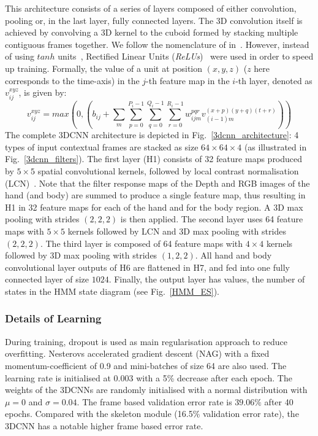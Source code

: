 This  architecture consists of a series of layers composed of either convolution, pooling or, in the last layer, fully connected layers.
The 3D convolution itself is achieved by convolving a 3D kernel to the cuboid formed by stacking multiple contiguous frames together.
We follow the nomenclature of in~\cite{ji20133d}.
However, instead of using $tanh$ units~\cite{ji20133d},  Rectified Linear Units (\emph{ReLUs})~\cite{krizhevsky2012imagenet}
were used in order to speed up training.
Formally, the value of a unit at position $(x, y, z)$ ($z$ here corresponds to the time-axis) in the $j$-th feature map in the $i$-th layer, denoted as $v^{xyz}_{ij}$, is given by:
\begin{equation}
v^{xyz}_{ij} =  max( 0,  ( b_{ij} + \sum_m \sum_{p=0}^{P_i - 1} \sum_{q=0}^{Q_i -1 } \sum_{r=0}^{R_i -1} w^{pqr}_{ijm} v^{(x+p)(y+q)(t+r)}_{(i-1)m} ))
\label{ReLU}
\end{equation}
%
The complete 3DCNN architecture is depicted in Fig.~\ref{3dcnn_architecture}:
4 types of input contextual frames are stacked as size $64\times64\times4$ (as illustrated in Fig.~\ref{3dcnn_filters}).
%
The first layer (H1) consists of 32 feature maps produced by $5\times5$ spatial convolutional kernels,
followed by local contrast normalisation (LCN)~\cite{jarrett2009best}.
%
Note that the filter response maps of the Depth and RGB images of the hand (and body) are summed to produce a single feature map,
thus resulting in H1 in 32 feature maps for each of the hand and for the body region.
%
A 3D max pooling with strides $(2,2,2)$ is then applied.
%
The second layer uses 64 feature maps with $5\times5$ kernels followed by LCN and 3D max pooling with strides $(2,2,2)$.
The third layer is composed of 64 feature maps with $4\times4$ kernels followed by 3D max pooling with strides $(1,2,2)$.
All hand and body convolutional layer outputs of H6 are flattened in H7, and fed into one fully connected layer of size $1024$.
%
Finally, the output layer has \numberhiddenstate values, the number of states in the HMM state diagram (see Fig.~\ref{HMM_ES}).




\subsubsection{Details of Learning}
During training, dropout \cite{hinton2012improving} is used as main regularisation approach to reduce overfitting.
Nesterovs accelerated gradient descent (NAG) \cite{sutskever2013importance} with a fixed momentum-coefficient of 0.9 and mini-batches of size 64 are also used.
The learning rate is initialised at 0.003 with a 5\% decrease after each epoch. The weights of the 3DCNNs are randomly initialised with a normal distribution with $\mu = 0$ and $\sigma = 0.04$.
The frame based validation error rate is $39.06\%$ after 40 epochs. %
Compared with the skeleton module (16.5\% validation error rate), the 3DCNN has a notable higher frame based error rate.


